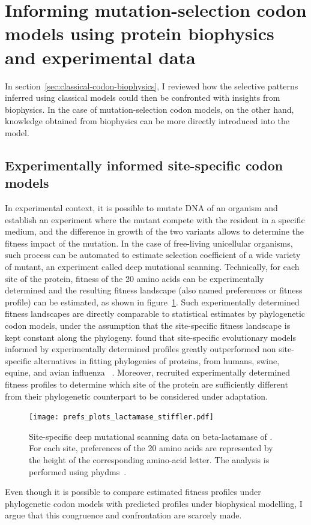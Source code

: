 \section{Informing mutation-selection codon models using protein biophysics and experimental data}
\label{sec:mechanistic-codon-biophysics}

In section~\ref{sec:classical-codon-biophysics}, I reviewed how the selective patterns inferred using classical models could then be confronted with insights from biophysics.
In the case of mutation-selection codon models, on the other hand, knowledge obtained from biophysics can be more directly introduced into the model.

\subsection{Experimentally informed site-specific codon models}

In experimental context, it is possible to mutate \acrshort{DNA} of an organism and establish an experiment where the mutant compete with the resident in a specific medium, and the difference in growth of the two variants allows to determine the fitness impact of the mutation.
In the case of free-living unicellular organisms, such process can be automated to estimate selection coefficient of a wide variety of mutant, an experiment called deep mutational scanning.
Technically, for each site of the protein, fitness of the 20 amino acids can be experimentally determined and the resulting fitness landscape (also named preferences or fitness profile) can be estimated, as shown in figure~\ref{fig:intro-deep-mut-profile}.
Such experimentally determined fitness landscapes are directly comparable to statistical estimates by phylogenetic codon models, under the assumption that the site-specific fitness landscape is kept constant along the phylogeny.
\citet{Bloom2014,Bloom2014a} found that site-specific evolutionary models informed by experimentally determined profiles greatly outperformed non site-specific alternatives in fitting phylogenies of proteins, from humans, swine, equine, and avian influenza~\citep{Doud2015} .
Moreover, \citet{Bloom2017} recruited experimentally determined fitness profiles to determine which site of the protein are sufficiently different from their phylogenetic counterpart to be considered under adaptation.

\begin{figure}[H]
    \centering
    \texttt{[image: prefs\_plots\_lactamase\_stiffler.pdf]}
    \caption[Deep mutational scanning profile]{
    Site-specific deep mutational scanning data on beta-lactamase of \citet{Stiffler2015}.
    For each site, preferences of the 20 amino acids are represented by the height of the corresponding amino-acid letter.
    The analysis is performed using phydms~\citep{Hilton2017}.}
    \label{fig:intro-deep-mut-profile}
\end{figure}
Even though it is possible to compare estimated fitness profiles under phylogenetic codon models with predicted profiles under biophysical modelling, I argue that this congruence and confrontation are scarcely made.

